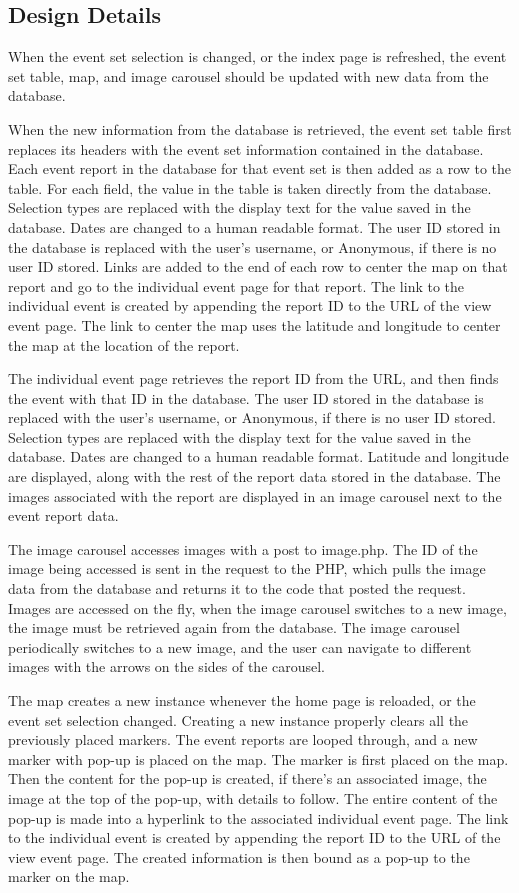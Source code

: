 \subsection{Design Details}
When the event set selection is changed, or the index page is refreshed, the event set table, map, and image carousel should be updated with new data from the database.

When the new information from the database is retrieved, the event set table first replaces its headers with the event set information contained in the database. Each event report in the database for that event set is then added as a row to the table. For each field, the value in the table is taken directly from the database. Selection types are replaced with the display text for the value saved in the database. Dates are changed to a human readable format. The user ID stored in the database is replaced with the user's username, or Anonymous, if there is no user ID stored. Links are added to the end of each row to center the map on that report and go to the individual event page for that report. The link to the individual event is created by appending the report ID to the URL of the view event page. The link to center the map uses the latitude and longitude to center the map at the location of the report.

The individual event page retrieves the report ID from the URL, and then finds the event with that ID in the database.  The user ID stored in the database is replaced with the user's username, or Anonymous, if there is no user ID stored. Selection types are replaced with the display text for the value saved in the database. Dates are changed to a human readable format. Latitude and longitude are displayed, along with the rest of the report data stored in the database. The images associated with the report are displayed in an image carousel next to the event report data.

The image carousel accesses images with a post to image.php. The ID of the image being accessed is sent in the request to the PHP, which pulls the image data from the database and returns it to the code that posted the request. Images are accessed on the fly, when the image carousel switches to a new image, the image must be retrieved again from the database. The image carousel periodically switches to a new image, and the user can navigate to different images with the arrows on the sides of the carousel. 

The map creates a new instance whenever the home page is reloaded, or the event set selection changed. Creating a new instance properly clears all the previously placed markers. The event reports are looped through, and a new marker with pop-up is placed on the map. The marker is first placed on the map. Then the content for the pop-up is created, if there's an associated image, the image at the top of the pop-up, with details to follow. The entire content of the pop-up is made into a hyperlink to the associated individual event page. The link to the individual event is created by appending the report ID to the URL of the view event page. The created information is then bound as a pop-up to the marker on the map.
